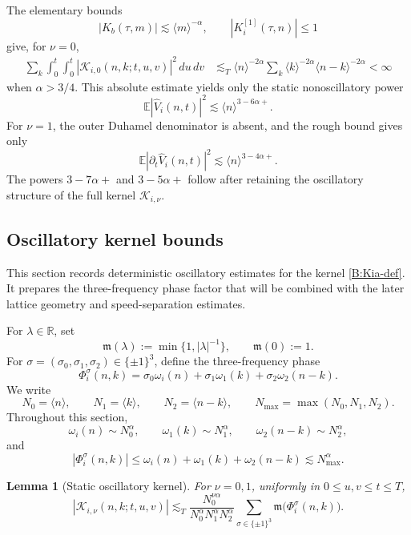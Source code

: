 \documentclass[10pt]{amsart}
\numberwithin{equation}{section}
\theoremstyle{plain}
\newtheorem{lemma}[theorem]{Lemma}
\theoremstyle{definition}
\theoremstyle{remark}
\newcommand{\R}{\mathbb{R}}
\newcommand{\E}{\mathbb{E}}
\newcommand{\calK}{\mathcal{K}}
\newcommand{\la}{\langle}
\newcommand{\ra}{\rangle}
\newcommand{\frakm}{\mathfrak{m}}
\begin{document}
The elementary bounds
\[
        |K_b(\tau,m)|\lesssim\la m\ra^{-\alpha},
        \qquad
        |K_i^{[1]}(\tau,n)|\le1
\]
give, for \(\nu=0\),
\[
\begin{aligned}
        \sum_k\int_0^t\int_0^t|\calK_{i,0}(n,k;t,u,v)|^2\,du\,dv
        &\lesssim_T
        \la n\ra^{-2\alpha}
        \sum_k\la k\ra^{-2\alpha}\la n-k\ra^{-2\alpha}<\infty
\end{aligned}
\]
when \(\alpha>3/4\).  This absolute estimate yields only the static nonoscillatory power
\[
        \E|\widehat V_i(n,t)|^2\lesssim\la n\ra^{3-6\alpha+}.
\]
For \(\nu=1\), the outer Duhamel denominator is absent, and the rough bound gives only
\[
        \E|\partial_t\widehat V_i(n,t)|^2\lesssim\la n\ra^{3-4\alpha+}.
\]
The powers \(3-7\alpha+\) and \(3-5\alpha+\) follow after retaining the oscillatory structure of the full kernel \(\calK_{i,\nu}\).

\subsection{Oscillatory kernel bounds}

This section records deterministic oscillatory estimates for the kernel \eqref{B:Kia-def}.  It prepares the three-frequency phase factor that will be combined with the later lattice geometry and speed-separation estimates.

For \(\lambda\in\R\), set
\[
        \frakm(\lambda):=\min\{1,|\lambda|^{-1}\},
        \qquad
        \frakm(0):=1.
\]
For \(\sigma=(\sigma_0,\sigma_1,\sigma_2)\in\{\pm1\}^3\), define the three-frequency phase
\begin{equation}\label{B:phase-def}
        \Phi_i^\sigma(n,k)
        =
        \sigma_0\omega_i(n)+\sigma_1\omega_1(k)+\sigma_2\omega_2(n-k).
\end{equation}
We write
\[
        N_0=\la n\ra,
        \qquad
        N_1=\la k\ra,
        \qquad
        N_2=\la n-k\ra,
        \qquad
        N_{\max}=\max(N_0,N_1,N_2).
\]
Throughout this section,
\[
        \omega_i(n)\sim N_0^\alpha,
        \qquad
        \omega_1(k)\sim N_1^\alpha,
        \qquad
        \omega_2(n-k)\sim N_2^\alpha,
\]
and
\[
        |\Phi_i^\sigma(n,k)|\le
        \omega_i(n)+\omega_1(k)+\omega_2(n-k)
        \lesssim N_{\max}^\alpha.
\]

\begin{lemma}[Static oscillatory kernel]\label{lem:B-static-kernel}
For \(\nu=0,1\), uniformly in \(0\le u,v\le t\le T\),
\begin{equation}\label{B:static-kernel}
        |\calK_{i,\nu}(n,k;t,u,v)|
        \lesssim_T
        \frac{N_0^{\nu\alpha}}{N_0^\alpha N_1^\alpha N_2^\alpha}
        \sum_{\sigma\in\{\pm1\}^3}\frakm\bigl(\Phi_i^\sigma(n,k)\bigr).
\end{equation}
\end{lemma}
\end{document}
